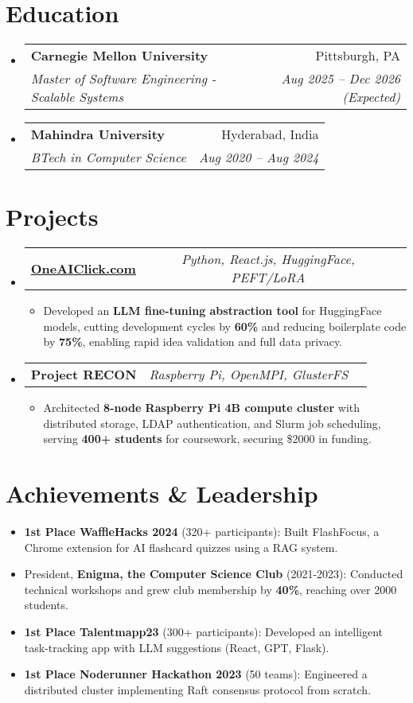 \documentclass[a4paper,11pt]{article}
\makeatletter
\newcommand{\resumeItem}[1]{
  \item\small{#1}
}
\newcommand{\resumeItemListStart}{\begin{itemize}[rightmargin=0.11in]}
\newcommand{\resumeItemListEnd}{\end{itemize}}
\newcommand{\resumeTrioHeading}[3]{
  \item\small{
    \begin{tabular*}{0.96\textwidth}[t]{
      l@{\extracolsep{\fill}}c@{\extracolsep{\fill}}r
    }
      \textbf{#1} & \textit{#2} & #3
    \end{tabular*}
  }
}
\newcommand{\resumeQuadHeading}[4]{
  \item
  \begin{tabular*}{0.96\textwidth}[t]{l@{\extracolsep{\fill}}r}
    \textbf{#1} & #2 \\
    \textit{\small#3} & \textit{\small #4} \\
  \end{tabular*}
}
\newcommand{\resumeHeadingListStart}{
  \begin{itemize}[leftmargin=0.15in, label={}]
}
\newcommand{\resumeHeadingListEnd}{\end{itemize}}
\makeatother
\begin{document}

\section{Education}
  \resumeHeadingListStart{}
    \resumeQuadHeading{Carnegie Mellon University}{Pittsburgh, PA}
    {Master of Software Engineering - Scalable Systems}{Aug 2025 -- Dec 2026 (Expected)}
    \resumeQuadHeading{Mahindra University}{Hyderabad, India}
    {BTech in Computer Science}{Aug 2020 -- Aug 2024}
  \resumeHeadingListEnd{}



\section{Projects}
  \resumeHeadingListStart{}
    \resumeTrioHeading{\href{https://oneaiclick.com}{\uline{OneAIClick.com}}}{Python, React.js, HuggingFace, PEFT/LoRA}{}
      \resumeItemListStart{}
        \resumeItem{Developed an \textbf{LLM fine-tuning abstraction tool} for HuggingFace models, cutting development cycles by \textbf{60\%} and reducing boilerplate code by \textbf{75\%}, enabling rapid idea validation and full data privacy.}
      \resumeItemListEnd{}

      \resumeTrioHeading{Project RECON}{Raspberry Pi, OpenMPI, GlusterFS}{}
      \resumeItemListStart{}
        \resumeItem{Architected \textbf{8-node Raspberry Pi 4B compute cluster} with distributed storage, LDAP authentication, and Slurm job scheduling, serving \textbf{400+ students} for coursework, securing \$2000 in funding.}
      \resumeItemListEnd{}
  \resumeHeadingListEnd{}



\section{Achievements & Leadership}
  \resumeItemListStart{}
    \resumeItem{\textbf{1st Place WaffleHacks 2024} (320+ participants): Built FlashFocus, a Chrome extension for AI flashcard quizzes using a RAG system.}
    \resumeItem{President, \textbf{Enigma, the Computer Science Club} (2021-2023): Conducted technical workshops and grew club membership by \textbf{40\%}, reaching over 2000 students.}
    \resumeItem{\textbf{1st Place Talentmapp23} (300+ participants): Developed an intelligent task-tracking app with LLM suggestions (React, GPT, Flask).}
    \resumeItem{\textbf{1st Place Noderunner Hackathon 2023} (50 teams): Engineered a distributed cluster implementing Raft consensus protocol from scratch.}
  \resumeItemListEnd{}
\end{document}
